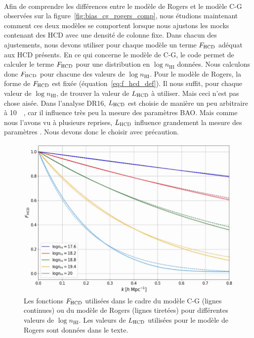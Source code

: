 \paragraph{}
Afin de comprendre les différences entre le modèle de Rogers et le modèle C-G observées sur la figure~\ref{fig:bias_cg_rogers_comp},
nous étudions maintenant comment ces deux modèles se comportent lorsque nous ajustons les mocks contenant des HCD avec une densité de colonne fixe.
Dans chacun des ajustements, nous devons utiliser pour chaque modèle un terme $F_{\textsc{HCD}}$ adéquat aux HCD présents.
En ce qui concerne le modèle de C-G, le code \picca{} permet de calculer le terme $F_{\textsc{HCD}}$ pour une distribution en $\log n_{\mathrm{HI}}$ données. Nous calculons donc $F_{\textsc{HCD}}$ pour chacune des valeurs de $\log n_{\mathrm{HI}}$.
Pour le modèle de Rogers, la forme de $F_{\textsc{HCD}}$ est fixée (équation~\ref{eq:f_hcd_def}). Il nous suffit, pour chaque valeur de $\log n_{\mathrm{HI}}$, de trouver la valeur de $L_{\textsc{HCD}}$ à utiliser. Mais ceci n'est pas chose aisée. Dans l'analyse DR16, $L_{\textsc{HCD}}$ est choisie de manière un peu arbitraire à \SI{10}{\perh\Mpc}, car il influence très peu la mesure des paramètres BAO.
Mais comme nous l'avons vu à plusieurs reprises, $L_{\textsc{HCD}}$ influence grandement la mesure des paramètres \lya{}. Nous devons donc le choisir avec précaution.

\begin{figure}
  \centering
  \includegraphics[scale=0.4]{f_hcd_fixed}
  \caption{Les fonctions $F_{\textsc{HCD}}$ utilisées dans le cadre du modèle C-G (lignes continues) ou du modèle de Rogers (lignes tiretées) pour différentes valeurs de $\log n_{\mathrm{HI}}$. Les valeurs de  $L_{\textsc{HCD}}$ utilisées pour le modèle de Rogers sont données dans le texte.
}
  \label{fig:f_hcd_fixed}
\end{figure}

